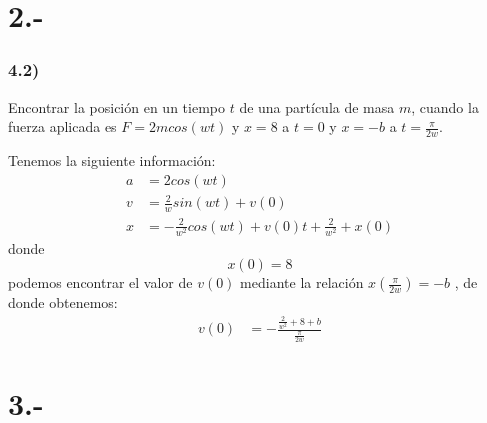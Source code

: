 \documentclass{article}
\begin{document}
\section*{2.-}
\subsubsection*{4.2)}
Encontrar la posición en un tiempo $t$ de una partícula de masa $m$, cuando la fuerza aplicada
es $F=2mcos(wt)$ y $x=8$ a $t=0$ y $x=-b$ a $t=\frac{\pi}{2w}$.
\begin{tcolorbox}[breakable]
    Tenemos la siguiente información:
    \begin{align*}
        a &= 2cos(wt)  \\
        v &= \frac{2}{w}sin(wt) + v(0)  \\ 
        x &= -\frac{2}{w^2}cos(wt) + v(0)t + \frac{2}{w^2} + x(0) 
    \end{align*}
    donde 
    \[x(0) = 8 \]
    podemos encontrar el valor de $v(0)$ mediante la relación $x(\frac{\pi}{2w}) = -b$
    , de donde obtenemos:
    \begin{align*}
        v(0) &= -\frac{\frac{2}{w^2} + 8 + b}{\frac{\pi}{2w}}
    \end{align*}
\end{tcolorbox}

\section*{3.-}
\end{document}
